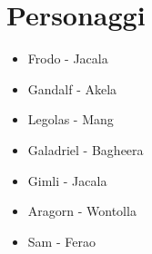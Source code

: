 \documentclass[../main.tex]{subfiles}
\begin{document}
    \section{Personaggi}
    \begin{itemize}
        \item Frodo - Jacala
        \item Gandalf - Akela
        \item Legolas - Mang
        \item Galadriel - Bagheera
        \item Gimli - Jacala
        \item Aragorn - Wontolla
        \item Sam - Ferao
    \end{itemize}
\end{document}
